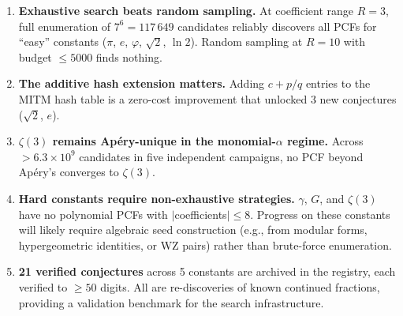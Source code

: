 \documentclass[11pt,a4paper]{article}
\begin{document}
\begin{enumerate}[leftmargin=2em]
\item \textbf{Exhaustive search beats random sampling.}
      At coefficient range $R=3$, full enumeration of $7^6 = 117\,649$
      candidates reliably discovers all PCFs for ``easy'' constants
      ($\pi$, $e$, $\varphi$, $\sqrt{2}$, $\ln 2$).
      Random sampling at $R=10$ with budget $\le 5000$ finds nothing.
\item \textbf{The additive hash extension matters.}
      Adding $c + p/q$ entries to the MITM hash table is a zero-cost
      improvement that unlocked 3 new conjectures ($\sqrt{2}$, $e$).
\item \textbf{$\zeta(3)$ remains Ap\'ery-unique in the monomial-$\alpha$
      regime.}  Across $>6.3\times10^9$ candidates in five independent
      campaigns, no PCF beyond Ap\'ery's converges to $\zeta(3)$.
\item \textbf{Hard constants require non-exhaustive strategies.}
      $\gamma$, $G$, and $\zeta(3)$ have no polynomial PCFs with
      $|$coefficients$| \le 8$.  Progress on these constants will likely
      require algebraic seed construction (e.g., from modular forms,
      hypergeometric identities, or WZ pairs) rather than brute-force
      enumeration.
\item \textbf{21 verified conjectures} across 5 constants are archived in
      the registry, each verified to $\ge 50$ digits.
      All are re-discoveries of known continued fractions, providing a
      validation benchmark for the search infrastructure.
\end{enumerate}
\end{document}
